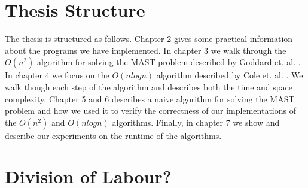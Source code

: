\section{Thesis Structure}
The thesis is structured as follows. Chapter 2 gives some practical information about the programs we have implemented. In chapter 3 we walk through the $O(n^2)$ algorithm for solving the MAST problem described by Goddard et. al. \cite{nsquared}. In chapter 4 we focus on the $O(nlogn)$ algorithm described by Cole et. al. \cite{nlogn}. We walk though each step of the algorithm and describes both the time and space complexity. Chapter 5 and 6 describes a naive algorithm for solving the MAST problem and how we used it to verify the correctness of our implementations of the $O(n^2)$ and $O(nlogn)$ algorithms. Finally, in chapter 7 we show and describe our experiments on the runtime of the algorithms.

\section{Division of Labour?}